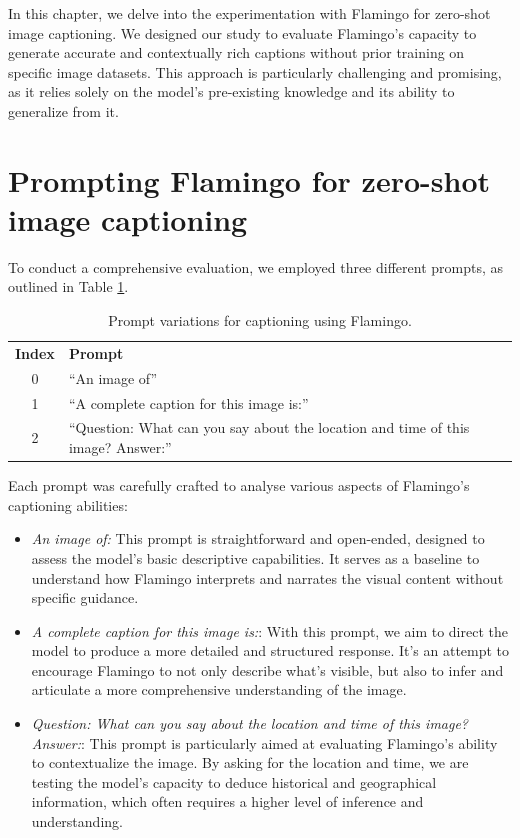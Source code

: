 In this chapter, we delve into the experimentation with Flamingo for zero-shot image captioning. We designed our study to evaluate Flamingo's capacity to generate accurate and contextually rich captions without prior training on specific image datasets. This approach is particularly challenging and promising, as it relies solely on the model's pre-existing knowledge and its ability to generalize from it.

\section{Prompting Flamingo for zero-shot image captioning}

To conduct a comprehensive evaluation, we employed three different prompts, as outlined in Table \ref{tab:cap-prompts}. 

\begin{table}[h]
    \centering
    \begin{tabular}{cl}
        \rowcolor{lightgreen} \textbf{Index} & \textbf{Prompt} \\
        \rowcolor{lightgreen} 0 & “An image of” \\
        \rowcolor{lightgreen} 1 & “A complete caption for this image is:” \\
        \rowcolor{lightgreen} 2 & “Question: What can you say about the location and time of this image? Answer:”
    \end{tabular}
    \caption{Prompt variations for captioning using Flamingo.}
    \label{tab:cap-prompts}
\end{table}

Each prompt was carefully crafted to analyse various aspects of Flamingo's captioning abilities:

\begin{itemize}
    \item \textit{An image of:} This prompt is straightforward and open-ended, designed to assess the model's basic descriptive capabilities. It serves as a baseline to understand how Flamingo interprets and narrates the visual content without specific guidance.
    \item \textit{A complete caption for this image is:}: With this prompt, we aim to direct the model to produce a more detailed and structured response. It's an attempt to encourage Flamingo to not only describe what's visible, but also to infer and articulate a more comprehensive understanding of the image.
    \item \textit{Question: What can you say about the location and time of this image? Answer:}: This prompt is particularly aimed at evaluating Flamingo's ability to contextualize the image. By asking for the location and time, we are testing the model's capacity to deduce historical and geographical information, which often requires a higher level of inference and understanding.

\end{itemize}



